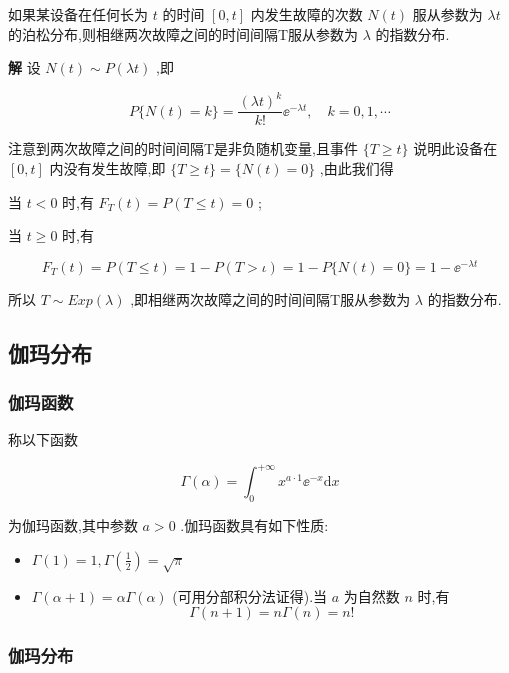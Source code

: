 \begin{example}
	如果某设备在任何长为 $ t $ 的时间 $ [0,t] $ 内发生故障的次数 $ N(t) $ 服从参数为 $ \lambda t $ 的泊松分布,则相继两次故障之间的时间间隔T服从参数为 $ \lambda $ 的指数分布.
	
	\textbf{解} 设 $ N(t) \sim P(\lambda t) $ ,即
	
	\[
	P\{N(t)=k\}=\frac{(\lambda t)^{k}}{k !} \ee ^{-\lambda t}, \quad k=0,1, \cdots
	\]
	
	注意到两次故障之间的时间间隔T是非负随机变量,且事件 $ \{T \geqslant t\} $ 说明此设备在 $ [0,t] $ 内没有发生故障,即 $ \{T \geqslant t\}=\{N(t)=0\} $ ,由此我们得
	
	当 $ t<0 $ 时,有 $ F_{T}(t)=P(T \leqslant t)=0 $ ;
	
	当 $ t \geqslant 0 $ 时,有
	
	\[
	F_{T}(t)=P(T \leqslant t)=1-P(T>\iota)=1-P\{N(t)=0\}=1-\ee ^{-\lambda t}
	\]
	
	所以 $ T \sim E x p(\lambda) $ ,即相继两次故障之间的时间间隔T服从参数为 $ \lambda $ 的指数分布.
\end{example}

\subsection{伽玛分布}

\subsubsection{伽玛函数}

称以下函数

\begin{equation}
\Gamma(\alpha)=\int_{0}^{+\infty} x^{a \cdot 1} \ee ^{-x} \mathrm{d} x \label{eq:2.5.11}
\end{equation}

为伽玛函数,其中参数 $ a>0 $ .伽玛函数具有如下性质:

\begin{itemize}
	\item $ \Gamma(1)=1, \Gamma\left(\frac{1}{2}\right)=\sqrt{\pi} $ 
	\item $ \Gamma(\alpha+1)=\alpha \Gamma(\alpha) $ (可用分部积分法证得).当 $ a $ 为自然数 $ n $ 时,有
	\[
	\Gamma(n+1)=n \Gamma(n)=n !
	\]
\end{itemize}

\subsubsection{伽玛分布}

